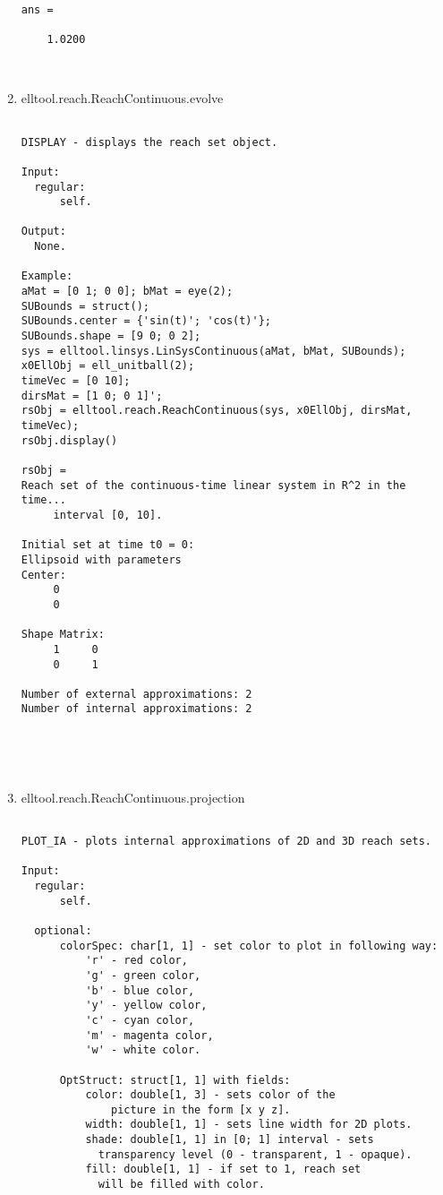 \begin{enumerate}
\begin{lstlisting}
ans =

    1.0200



\end{lstlisting}
\fontfamily{\familydefault}
\selectfont
\item {elltool.reach.ReachContinuous.evolve}
\selectfont
\begin{lstlisting}

DISPLAY - displays the reach set object.

Input:
  regular:
      self.

Output:
  None.

Example:
aMat = [0 1; 0 0]; bMat = eye(2);
SUBounds = struct();
SUBounds.center = {'sin(t)'; 'cos(t)'};
SUBounds.shape = [9 0; 0 2];
sys = elltool.linsys.LinSysContinuous(aMat, bMat, SUBounds);
x0EllObj = ell_unitball(2);
timeVec = [0 10];
dirsMat = [1 0; 0 1]';
rsObj = elltool.reach.ReachContinuous(sys, x0EllObj, dirsMat, timeVec);
rsObj.display()

rsObj =
Reach set of the continuous-time linear system in R^2 in the time...
     interval [0, 10].

Initial set at time t0 = 0:
Ellipsoid with parameters
Center:
     0
     0

Shape Matrix:
     1     0
     0     1

Number of external approximations: 2
Number of internal approximations: 2





\end{lstlisting}
\fontfamily{\familydefault}
\selectfont
\item {elltool.reach.ReachContinuous.projection}
\selectfont
\begin{lstlisting}

PLOT_IA - plots internal approximations of 2D and 3D reach sets.

Input:
  regular:
      self.

  optional:
      colorSpec: char[1, 1] - set color to plot in following way:
          'r' - red color,
          'g' - green color,
          'b' - blue color,
          'y' - yellow color,
          'c' - cyan color,
          'm' - magenta color,
          'w' - white color.

      OptStruct: struct[1, 1] with fields:
          color: double[1, 3] - sets color of the
              picture in the form [x y z].
          width: double[1, 1] - sets line width for 2D plots.
          shade: double[1, 1] in [0; 1] interval - sets
            transparency level (0 - transparent, 1 - opaque).
          fill: double[1, 1] - if set to 1, reach set
            will be filled with color.


\end{lstlisting}
\end{enumerate}
